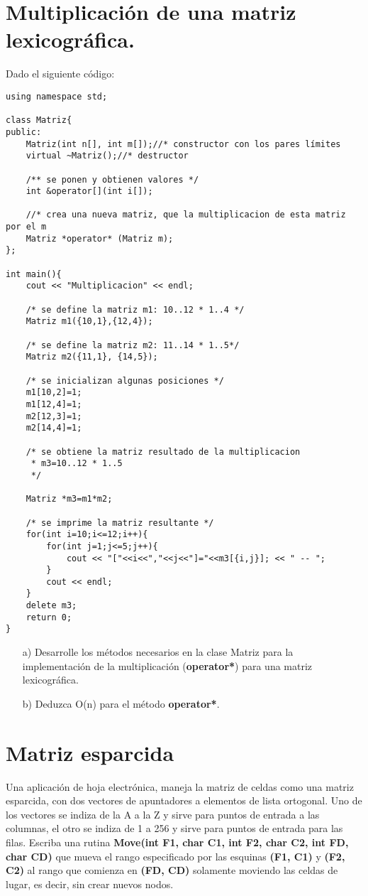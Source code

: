 \section{Multiplicación de una matriz lexicográfica.}
\label{sec:mult-de-una}
Dado el siguiente código:
\begin{lstlisting}[style=miEstilo, numbers=none]
using namespace std;

class Matriz{
public:
    Matriz(int n[], int m[]);//* constructor con los pares límites
    virtual ~Matriz();//* destructor

    /** se ponen y obtienen valores */
    int &operator[](int i[]);

    //* crea una nueva matriz, que la multiplicacion de esta matriz por el m
    Matriz *operator* (Matriz m);
};

int main(){
    cout << "Multiplicacion" << endl;

    /* se define la matriz m1: 10..12 * 1..4 */
    Matriz m1({10,1},{12,4});

    /* se define la matriz m2: 11..14 * 1..5*/
    Matriz m2({11,1}, {14,5});

    /* se inicializan algunas posiciones */
    m1[10,2]=1;
    m1[12,4]=1;
    m2[12,3]=1;
    m2[14,4]=1;

    /* se obtiene la matriz resultado de la multiplicacion
     * m3=10..12 * 1..5
     */

    Matriz *m3=m1*m2;

    /* se imprime la matriz resultante */
    for(int i=10;i<=12;i++){
        for(int j=1;j<=5;j++){
            cout << "["<<i<<","<<j<<"]="<<m3[{i,j}]; << " -- ";
        }
        cout << endl;
    }
    delete m3;
    return 0;
}
\end{lstlisting}

\begin{itemize}
\item[a)] Desarrolle los métodos necesarios en la clase Matriz para la
  implementación de la multiplicación (\textbf{operator*}) para una
  matriz lexicográfica.
\item [b)] Deduzca O(n) para el método \textbf{operator*}.
\end{itemize}

\section{Matriz esparcida}

Una aplicación de hoja electrónica, maneja la matriz de celdas como
una matriz esparcida, con dos vectores de apuntadores a elementos de
lista ortogonal. Uno de los vectores se indiza de la A a la Z y sirve
para puntos de entrada a las columnas, el otro se indiza de 1 a 256 y
sirve para puntos de entrada para las filas. Escriba una rutina
\textbf{Move(int F1, char C1, int F2, char C2, int FD, char CD)} que
mueva el rango especificado por las esquinas \textbf{(F1, C1)} y
\textbf{(F2, C2)} al rango que comienza en \textbf{(FD, CD)} solamente
moviendo las celdas de lugar, es decir, sin crear nuevos nodos.


